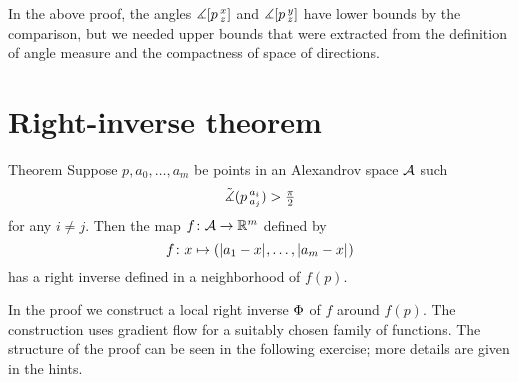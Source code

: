 In the above proof, the angles $\measuredangle[p\,{}^{x}_{z}]$ and $\measuredangle[p\,{}^{y}_{z}]$ have lower bounds by 
the comparison, but we needed upper bounds that were extracted from the definition of angle measure and the compactness of space of directions.

\section{Right-inverse theorem}

\begin{thm}{Theorem}\label{thm:right-inverse}
Suppose $p,a_0,\dots,a_m$ be points in an Alexandrov space $\mathcal{A}$ such
\[\tilde\measuredangle(p\,{}^{a_i}_{a_j})>\tfrac\pi2\]
for any $i\ne j$.
Then the map $f\colon\mathcal{A}\to\mathbb{R}^m$ defined by
\[f\colon x\mapsto (|{a_1}-{x}|_{}^{{}},\dots,|{a_m}-{x}|_{}^{{}})\]
has a right inverse defined in a neighborhood of $f(p)$.
\end{thm}

In the proof we construct a local right inverse $\Phi$ of $f$ around $f(p)$.
The construction uses gradient flow for a suitably chosen family of functions.
The structure of the proof can be seen in the following exercise;
more details are given in the hints.

